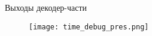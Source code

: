 
\begin{frame}{Выходы декодер-части}
\begin{figure}
\centering
\texttt{[image: time\_debug\_pres.png]}
\end{figure}
\end{frame}